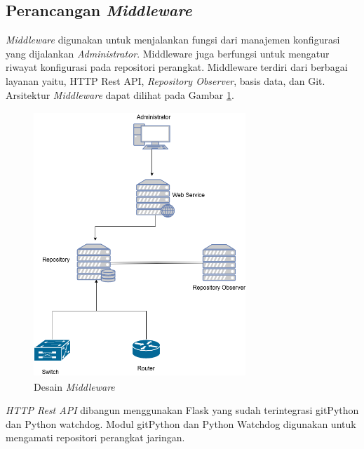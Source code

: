 		\subsection{Perancangan \textit{Middleware}}
        	\textit{Middleware} digunakan untuk menjalankan fungsi dari manajemen konfigurasi yang dijalankan \textit{Administrator}. Middleware juga berfungsi untuk mengatur riwayat konfigurasi pada repositori perangkat. Middleware terdiri dari berbagai layanan yaitu, HTTP Rest API, \textit{Repository Observer}, basis data, dan Git. Arsitektur \textit{Middleware} dapat dilihat pada Gambar \ref{desain:middleware}. \\
            
                \begin{figure}[H]
                    \centering
                    \includegraphics[width=8cm,height=10cm]{Images/C-3/Middleware.png}
                    \caption{Desain \textit{Middleware}}
                    \label{desain:middleware}
				\end{figure}
            \indent \textit{HTTP Rest API} dibangun menggunakan Flask yang sudah terintegrasi gitPython dan Python watchdog. Modul gitPython dan Python Watchdog digunakan untuk mengamati repositori perangkat jaringan.
            
